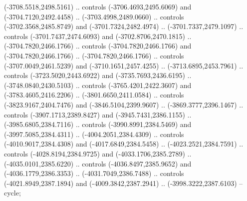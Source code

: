 \begin{scope}[shift={(430.80877,-416.69739)}]
\begin{scope}[shift={(4537.8125,-1856.4436)}]
\begin{scope}[shift={(-148.39113,-28.14259)}]
        (-3708.5518,2498.5161) .. controls (-3706.4693,2495.6069) and
        (-3704.7120,2492.4458) .. (-3703.4998,2489.0660) .. controls
        (-3702.3568,2485.8749) and (-3701.7324,2482.4974) .. (-3701.7337,2479.1097) ..
        controls (-3701.7437,2474.6093) and (-3702.8706,2470.1815) ..
        (-3704.7820,2466.1766) .. controls (-3704.7820,2466.1766) and
        (-3704.7820,2466.1766) .. (-3704.7820,2466.1766) .. controls
        (-3707.0049,2461.5239) and (-3710.1651,2457.4255) .. (-3713.6895,2453.7961) ..
        controls (-3723.5020,2443.6922) and (-3735.7693,2436.6195) ..
        (-3748.0840,2430.5103) .. controls (-3765.4201,2422.3607) and
        (-3783.4605,2416.2206) .. (-3801.6650,2411.0584) .. controls
        (-3823.9167,2404.7476) and (-3846.5104,2399.9607) .. (-3869.3777,2396.1467) ..
        controls (-3907.1713,2389.8427) and (-3945.7431,2386.1155) ..
        (-3985.6805,2384.7116) .. controls (-3990.8991,2384.5469) and
        (-3997.5085,2384.4311) .. (-4004.2051,2384.4309) .. controls
        (-4010.9017,2384.4308) and (-4017.6849,2384.5458) .. (-4023.2521,2384.7591) ..
        controls (-4028.8194,2384.9725) and (-4033.1706,2385.2789) ..
        (-4035.0101,2385.6220) .. controls (-4036.8497,2385.9652) and
        (-4036.1779,2386.3353) .. (-4031.7049,2386.7488) .. controls
        (-4021.8949,2387.1894) and (-4009.3842,2387.2941) .. (-3998.3222,2387.6103) --
        cycle;


\end{scope}
\end{scope}
\end{scope}
